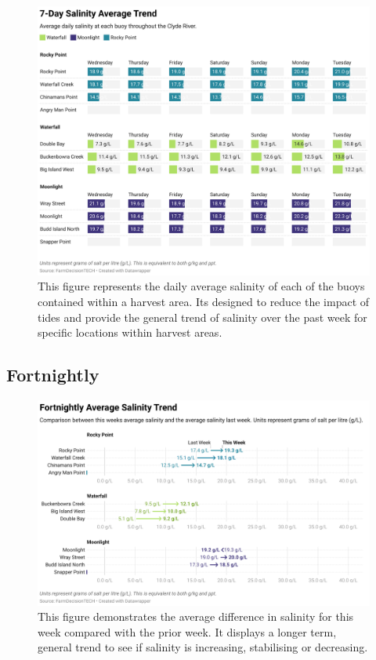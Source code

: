 \documentclass[10pt]{article}
\begin{document}
\begin{figure}[H]
\centering
\includegraphics[width=\textwidth]{weekly-salinity.png}
\caption[Average Weekly Salinity Table]{This figure represents the daily average salinity of each of the buoys contained within a harvest area. Its designed to reduce the impact of tides and provide the general trend of salinity over the past week for specific locations within harvest areas.}
\end{figure}

\pagebreak

\subsection{Fortnightly}

\begin{figure}[H]
\centering
\includegraphics[width=\textwidth]{fortnightly-salinity.png}
\caption[Average Fortnightly Salinity Difference]{This figure demonstrates the average difference in salinity for this week compared with the prior week. It displays a longer term, general trend to see if salinity is increasing, stabilising or decreasing.}
\end{figure}
\end{document}
